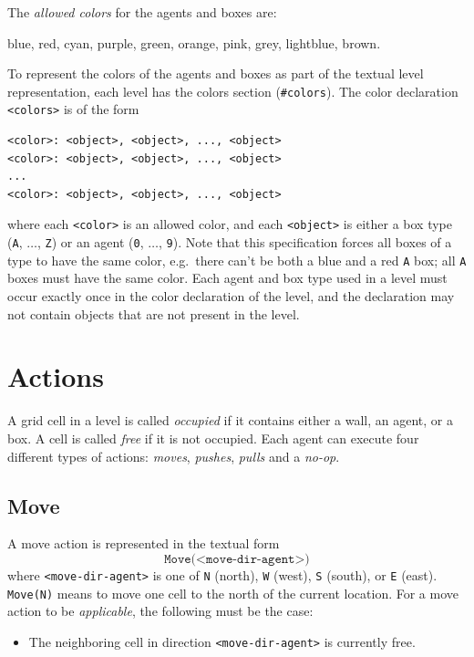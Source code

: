 \documentclass[12pt,a4paper]{article}
\begin{document}
The \emph{allowed colors} for the agents and boxes are:
\begin{center}
blue, red, cyan, purple, green, orange, pink, grey, lightblue, brown.
\end{center}
To represent the colors of the agents and boxes as part of the textual level representation, each level has the colors section (\texttt{\#colors}). The color declaration \texttt{<colors>} is of the form
\begin{verbatim}
<color>: <object>, <object>, ..., <object>
<color>: <object>, <object>, ..., <object>
...
<color>: <object>, <object>, ..., <object>
\end{verbatim}
where each \texttt{<color>} is an allowed color, and each \texttt{<object>} is either a box type (\texttt{A}, $\dots$, \texttt{Z}) or an agent (\texttt{0}, $\dots$, \texttt{9}). Note that this specification forces all boxes of a type to have the same color, e.g.\ there can't be both a blue and a red \texttt{A} box; all \texttt{A} boxes must have the same color. Each agent and box type used in a level must occur exactly once in the color declaration of the level, and the declaration may not contain objects that are not present in the level.

\section{Actions}\label{sect:actions}
A grid cell in a level is called \emph{occupied} if it contains either a wall, an agent, or a box. A cell is called \emph{free} if it is not occupied. Each agent can execute four different types of actions: \emph{moves}, \emph{pushes}, \emph{pulls} and a \emph{no-op}. 

\subsection{Move}
A move action is represented in the textual form
    \[
        \texttt{Move(<move-dir-agent>)}        
            \]
    where \texttt{<move-dir-agent>} is one of \texttt{N} (north), \texttt{W} (west), \texttt{S} (south), or \texttt{E} (east). \texttt{Move(N)} means to move one cell to the north of the current location. For a move action to be \emph{applicable}, the following must be the case:
    \begin{itemize}
        \item The neighboring cell in direction \texttt{<move-dir-agent>} is currently free.
    \end{itemize}
\end{document}
